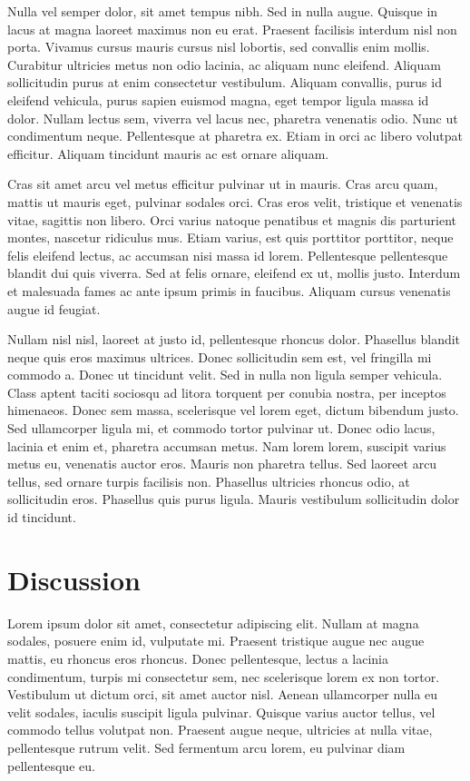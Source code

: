 \documentclass[10pt,conference,compsocconf]{IEEEtran}
\begin{document}
Nulla vel semper dolor, sit amet tempus nibh. Sed in nulla augue. Quisque in lacus at magna laoreet maximus non eu erat. Praesent facilisis interdum nisl non porta. Vivamus cursus mauris cursus nisl lobortis, sed convallis enim mollis. Curabitur ultricies metus non odio lacinia, ac aliquam nunc eleifend. Aliquam sollicitudin purus at enim consectetur vestibulum. Aliquam convallis, purus id eleifend vehicula, purus sapien euismod magna, eget tempor ligula massa id dolor. Nullam lectus sem, viverra vel lacus nec, pharetra venenatis odio. Nunc ut condimentum neque. Pellentesque at pharetra ex. Etiam in orci ac libero volutpat efficitur. Aliquam tincidunt mauris ac est ornare aliquam.

Cras sit amet arcu vel metus efficitur pulvinar ut in mauris. Cras arcu quam, mattis ut mauris eget, pulvinar sodales orci. Cras eros velit, tristique et venenatis vitae, sagittis non libero. Orci varius natoque penatibus et magnis dis parturient montes, nascetur ridiculus mus. Etiam varius, est quis porttitor porttitor, neque felis eleifend lectus, ac accumsan nisi massa id lorem. Pellentesque pellentesque blandit dui quis viverra. Sed at felis ornare, eleifend ex ut, mollis justo. Interdum et malesuada fames ac ante ipsum primis in faucibus. Aliquam cursus venenatis augue id feugiat.

Nullam nisl nisl, laoreet at justo id, pellentesque rhoncus dolor. Phasellus blandit neque quis eros maximus ultrices. Donec sollicitudin sem est, vel fringilla mi commodo a. Donec ut tincidunt velit. Sed in nulla non ligula semper vehicula. Class aptent taciti sociosqu ad litora torquent per conubia nostra, per inceptos himenaeos. Donec sem massa, scelerisque vel lorem eget, dictum bibendum justo. Sed ullamcorper ligula mi, et commodo tortor pulvinar ut. Donec odio lacus, lacinia et enim et, pharetra accumsan metus. Nam lorem lorem, suscipit varius metus eu, venenatis auctor eros. Mauris non pharetra tellus. Sed laoreet arcu tellus, sed ornare turpis facilisis non. Phasellus ultricies rhoncus odio, at sollicitudin eros. Phasellus quis purus ligula. Mauris vestibulum sollicitudin dolor id tincidunt.

\section{Discussion}
\label{sec:discussion}

Lorem ipsum dolor sit amet, consectetur adipiscing elit. Nullam at magna sodales, posuere enim id, vulputate mi. Praesent tristique augue nec augue mattis, eu rhoncus eros rhoncus. Donec pellentesque, lectus a lacinia condimentum, turpis mi consectetur sem, nec scelerisque lorem ex non tortor. Vestibulum ut dictum orci, sit amet auctor nisl. Aenean ullamcorper nulla eu velit sodales, iaculis suscipit ligula pulvinar. Quisque varius auctor tellus, vel commodo tellus volutpat non. Praesent augue neque, ultricies at nulla vitae, pellentesque rutrum velit. Sed fermentum arcu lorem, eu pulvinar diam pellentesque eu.
\end{document}
